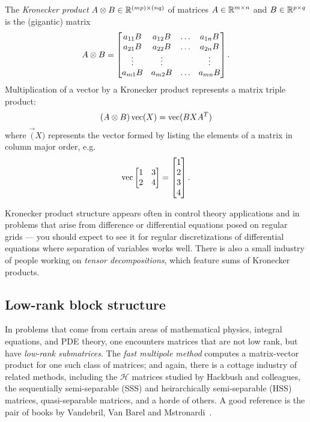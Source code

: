 The {\em Kronecker product} $A \kron B \in \bbR^{(mp) \times (nq)}$
of matrices $A \in \bbR^{m \times n}$ and $B \in \bbR^{p \times q}$
is the (gigantic) matrix
\[
  A \kron B =
  \begin{bmatrix}
    a_{11} B & a_{12} B & \ldots & a_{1n} B \\
    a_{21} B & a_{22} B & \ldots & a_{2n} B \\
    \vdots & \vdots & & \vdots \\
    a_{m1} B & a_{m2} B & \ldots & a_{mn} B
  \end{bmatrix}.
\]
Multiplication of a vector by a Kronecker product represents
a matrix triple product:
\[
  (A \kron B) \vec(X) = \vec(BXA^T)
\]
where $\vec(X)$ represents the vector formed by listing the
elements of a matrix in column major order, e.g.
\[
  \vec \begin{bmatrix} 1 & 3 \\ 2 & 4 \end{bmatrix} =
  \begin{bmatrix} 1 \\ 2 \\ 3 \\ 4 \end{bmatrix}.
\]

Kronecker product structure appears often in control theory
applications and in problems that arise from difference or
differential equations posed on regular grids --- you should
expect to see it for regular discretizations of differential
equations where separation of variables works well.  There is
also a small industry of people working on {\em tensor decompositions},
which feature sums of Kronecker products.

\subsection{Low-rank block structure}

In problems that come from certain areas of mathematical physics,
integral equations, and PDE theory, one encounters matrices that are not
low rank, but have  {\em low-rank submatrices}.  The {\em fast multipole
method} computes a matrix-vector product for one such class of matrices;
and again, there is a cottage industry of related methods, including
the $\mathcal{H}$ matrices studied by Hackbush and colleagues, the
sequentially semi-separable (SSS) and heirarchically
semi-separable (HSS) matrices, quasi-separable matrices, and a horde of
others.  A good reference is the pair of books by Vandebril, Van Barel
and Mstronardi~\cite{Vandebril:2010:Linear,Vandebril:2010:Eigen}.
